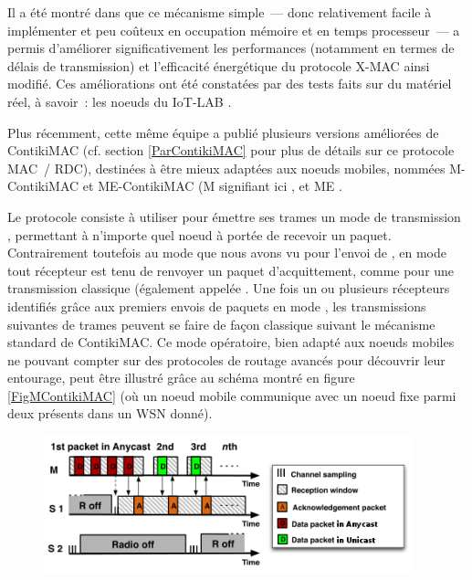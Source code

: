 Il a été montré dans \cite{T-AAD} que ce mécanisme simple~--- donc
relativement facile à implémenter et peu coûteux en occupation mémoire
et en temps processeur~--- a permis d'améliorer significativement les 
performances (notamment en termes de délais de transmission) et
l'efficacité énergétique du protocole X-MAC ainsi modifié. Ces améliorations
ont été constatées par des tests faits sur du matériel réel, à savoir~:
les noeuds du  IoT-LAB \cite{IotLAB}.

\bigskip

Plus récemment, cette même équipe a publié plusieurs versions améliorées
de ContikiMAC (cf. section \ref{ParContikiMAC} pour plus de détails sur
ce protocole MAC~/ RDC), destinées à être mieux adaptées aux noeuds mobiles,
nommées M-ContikiMAC et ME-ContikiMAC \cite{ME-ContikiMAC} (M signifiant ici
, et ME .

Le protocole  consiste à utiliser pour émettre ses trames
un mode de transmission , permettant à n'importe quel
noeud à portée de recevoir un paquet. Contrairement toutefois au mode
 que nous avons vu pour l'envoi de ,
en mode  tout récepteur est tenu de renvoyer un paquet
d'acquittement, comme pour une transmission classique (également appelée
. Une fois un ou plusieurs récepteurs identifiés grâce
aux premiers envois de paquets en mode , les transmissions
suivantes de trames peuvent se faire de façon classique 
suivant le mécanisme standard de ContikiMAC. Ce mode opératoire, bien
adapté aux noeuds mobiles ne pouvant compter sur des protocoles de routage
avancés pour découvrir leur entourage, peut être illustré grâce au schéma
montré en figure \vref{FigMContikiMAC} (où un noeud mobile communique
avec un noeud fixe parmi deux présents dans un WSN donné).

\begin{figure}[!htb]
\centering
\includegraphics[width=10.75cm]{images/ch3-m-contikimac.png}
\label{FigMContikiMAC}
\end{figure}


